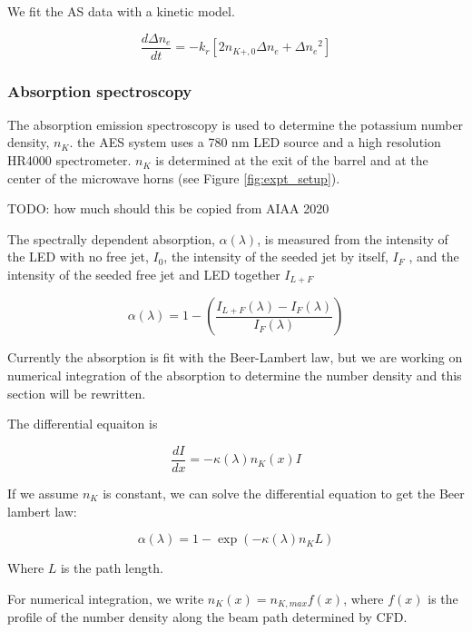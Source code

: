 We fit the AS data with a kinetic model. 

\begin{equation}
    \frac{d\Delta n_e}{dt} = - k_r [2 n_{K+,0}\Delta n_e + \Delta{n_e}^2]
\end{equation}

\subsubsection{Absorption spectroscopy}

The absorption emission spectroscopy is used to determine the potassium number density, $n_K$. the AES system uses a 780 nm LED source and a high resolution HR4000 spectrometer. $n_K$ is determined at the exit of the barrel and at the center of the microwave horns (see Figure \ref{fig:expt_setup}).

TODO: how much should this be copied from AIAA 2020

The spectrally dependent absorption, $\alpha(\lambda)$, is measured from the intensity of the LED with no free jet, $I_0$, the intensity
of the seeded jet by itself, $I_F$ , and the intensity of the seeded free jet and LED together $I_{L+F}$


\begin{equation}
    \alpha(\lambda) = 1 - \left(\frac{I_{L+F}(\lambda) - I_{F}(\lambda)}{I_F(\lambda)}\right)
\end{equation}

Currently the absorption is fit with the Beer-Lambert law, but we are working on numerical integration of the absorption to determine the number density and this section will be rewritten. 

The differential equaiton is 

\begin{equation}
    \frac{dI}{dx} = -\kappa(\lambda) n_K(x) I
\end{equation}

If we assume $n_K$ is constant, we can solve the differential equation to get the Beer lambert law:

\begin{equation}
    \alpha(\lambda) = 1 - \exp(-\kappa(\lambda) n_K L)
\end{equation}

Where $L$ is the path length.

For numerical integration, we write $n_K(x) = n_{K,max} f(x)$, where $f(x)$ is the profile of the number density along the beam path determined by CFD. 




